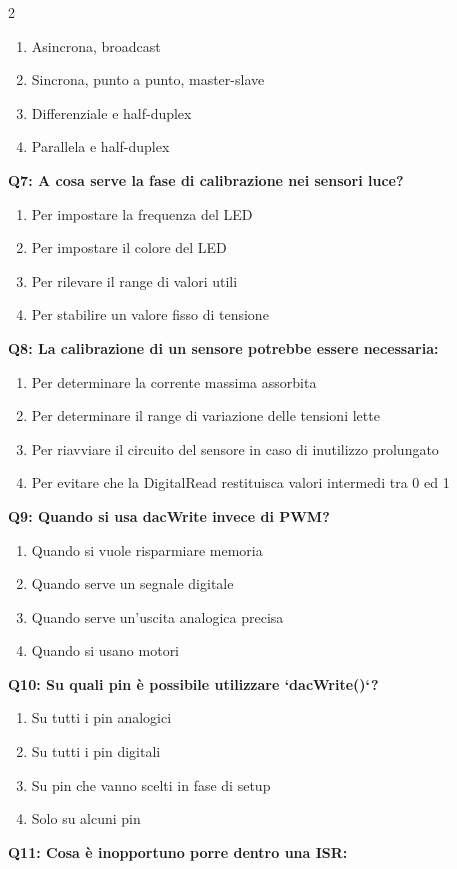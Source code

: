 \documentclass[10pt]{article}
\begin{document}
\begin{multicols}{2}
\begin{enumerate}[label=\arabic*.]
\item Asincrona, broadcast
\item Sincrona, punto a punto, master-slave
\item Differenziale e half-duplex
\item Parallela e half-duplex
\end{enumerate}
\textbf{Q7: A cosa serve la fase di calibrazione nei sensori luce?}

\begin{enumerate}[label=\arabic*.]
\item Per impostare la frequenza del LED
\item Per impostare il colore del LED
\item Per rilevare il range di valori utili
\item Per stabilire un valore fisso di tensione
\end{enumerate}
\textbf{Q8: La calibrazione di un sensore potrebbe essere necessaria:}

\begin{enumerate}[label=\arabic*.]
\item Per determinare la corrente massima assorbita
\item Per determinare il range di variazione delle tensioni lette
\item Per riavviare il circuito del sensore in caso di inutilizzo prolungato
\item Per evitare che la DigitalRead restituisca valori intermedi tra 0 ed 1
\end{enumerate}
\textbf{Q9: Quando si usa dacWrite invece di PWM?}

\begin{enumerate}[label=\arabic*.]
\item Quando si vuole risparmiare memoria
\item Quando serve un segnale digitale
\item Quando serve un’uscita analogica precisa
\item Quando si usano motori
\end{enumerate}
\textbf{Q10: Su quali pin è possibile utilizzare `dacWrite()`?}

\begin{enumerate}[label=\arabic*.]
\item Su tutti i pin analogici
\item Su tutti i pin digitali
\item Su pin che vanno scelti in fase di setup
\item Solo su alcuni pin
\end{enumerate}
\textbf{Q11: Cosa è inopportuno porre dentro una ISR:}


\end{multicols}
\end{document}
